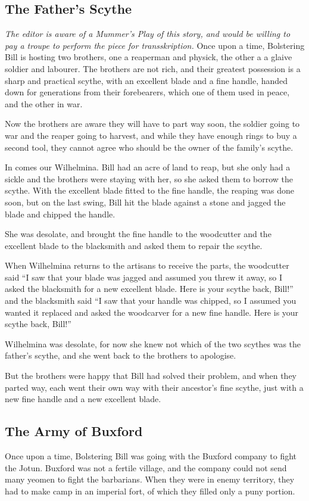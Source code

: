 \subsection{The Father's Scythe}
\textit{The editor is aware of a Mummer’s Play of this story, and would be willing to pay a troupe to perform the piece for transskription.}
Once upon a time, Bolstering Bill is hosting two brothers, one a reaperman and physick, the other a a glaive soldier and labourer. The brothers are not rich, and their greatest possession is a sharp and practical scythe, with an excellent blade and a fine handle, handed down for generations from their forebearers, which one of them used in peace, and the other in war.

Now the brothers are aware they will have to part way soon, the soldier going to war and the reaper going to harvest, and while they have enough rings to buy a second tool, they cannot agree who should be the owner of the family's scythe.

In comes our Wilhelmina. Bill had an acre of land to reap, but she only had a sickle and the brothers were staying with her, so she asked them to borrow the scythe. With the excellent blade fitted to the fine handle, the reaping was done soon, but on the last swing, Bill hit the blade against a stone and jagged the blade and chipped the handle.

She was desolate, and brought the fine handle to the woodcutter and the excellent blade to the blacksmith and asked them to repair the scythe.

When Wilhelmina returns to the artisans to receive the parts, the woodcutter said “I saw that your blade was jagged and assumed you threw it away, so I asked the blacksmith for a new excellent blade. Here is your scythe back, Bill!” and the blacksmith said “I saw that your handle was chipped, so I assumed you wanted it replaced and asked the woodcarver for a new fine handle. Here is your scythe back, Bill!”

Wilhelmina was desolate, for now she knew not which of the two scythes was the father’s scythe, and she went back to the brothers to apologise.

But the brothers were happy that Bill had solved their problem, and when they parted way, each went their own way with their ancestor's fine scythe, just with a new fine handle and a new excellent blade.

\subsection{The Army of Buxford}
Once upon a time, Bolstering Bill was going with the Buxford company to fight the Jotun. Buxford was not a fertile village, and the company could not send many yeomen to fight the barbarians. When they were in enemy territory, they had to make camp in an imperial fort, of which they filled only a puny portion.

